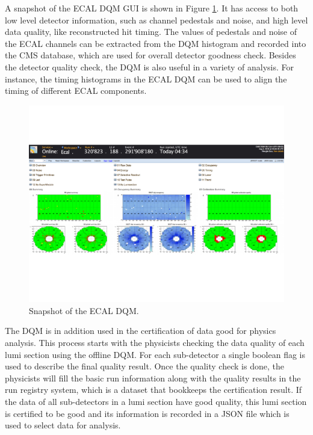 \documentclass[thesis.tex]{subfiles}
\begin{document}
A snapshot of the ECAL DQM GUI is shown in Figure \ref{fig:ecaldqm}.
It has access to both low level detector information, such as channel pedestals and noise, and high level data quality, like reconstructed hit timing. 
The values of pedestals and noise of the ECAL channels can be extracted from the DQM histogram and recorded into the CMS database, which are used for overall detector goodness check.
Besides the detector quality check, the DQM is also useful in a variety of analysis. 
For instance, the timing histograms in the ECAL DQM can be used to align the timing of different ECAL components. 

\begin{figure}[hbt]
	\centering
	\includegraphics[width=\textwidth]{Fig/ecaldqm.pdf}
	\caption{Snapshot of the ECAL DQM.}
	\label{fig:ecaldqm}
\end{figure}

The DQM is in addition used in the certification of data good for physics analysis.
This process starts with the physicists checking the data quality of each lumi section using the offline DQM.
For each sub-detector a single boolean flag is used to describe the final quality result.
Once the quality check is done, the physicists will fill the basic run information along with the quality results in the run registry system, which is a dataset that bookkeeps the certification result.
If the data of all sub-detectors in a lumi section have good quality, this lumi section is certified to be good and its information is recorded in a JSON file which is used to select data for analysis. 
\end{document}
